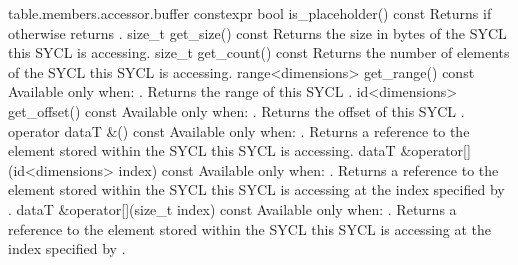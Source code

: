 {table.members.accessor.buffer}
  \addRow
    { constexpr bool is_placeholder() const }
    {
      Returns  if  otherwise returns .
    }
  \addRow
    { size_t get_size() const }
    {
      Returns the size in bytes of the SYCL  this SYCL
       is accessing.
    }
  \addRow
    { size_t get_count() const }
    {
      Returns the number of elements of the SYCL  this SYCL  is accessing.
    }
  \addRow
    { range<dimensions> get_range() const }
    {
      Available only when: .
      \newline
      Returns the range of this SYCL .
    }
  \addRow
    { id<dimensions> get_offset() const }
    {
      Available only when: .
      \newline
      Returns the offset of this SYCL .
    }
  \addRow
    { operator dataT \&() const }
    {
      Available only when: .
      \newline
      Returns a reference to the element stored within the SYCL  this SYCL  is accessing.
    }
  \addRow
    { dataT \&operator[](id<dimensions> index) const }
    {
      Available only when: .
      \newline
      Returns a reference to the element stored within the SYCL  this SYCL  is accessing at the index
      specified by .
    }
  \addRow
    { dataT \&operator[](size_t index) const }
    {
      Available only when: .
      \newline
      Returns a reference to the element stored within the SYCL  this SYCL  is accessing at the index
      specified by .
    }
